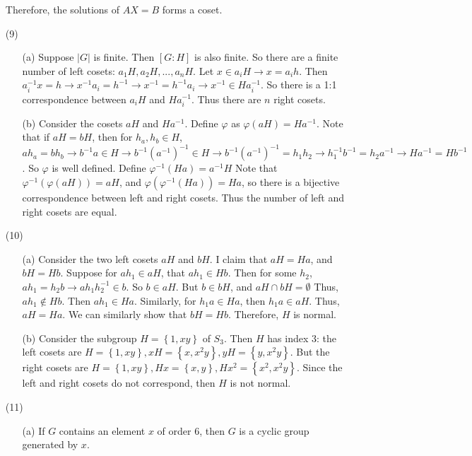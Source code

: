 \begin{itemize}
Therefore, the solutions of $AX = B$ forms a coset.

\item[(9)]
\begin{itemize}
\item[(a)]
Suppose $|G|$ is finite. Then $[G : H]$ is also finite. So there are a finite number of left cosets: $a_1H, a_2H, ..., a_nH$. Let $x \in a_iH \rightarrow x = a_ih$. Then $a_i^{-1}x = h \rightarrow x^{-1}a_i = h^{-1} \rightarrow x^{-1} = h^{-1}a_i \rightarrow x^{-1} \in Ha_i^{-1}$. So there is a 1:1 correspondence between $a_iH$ and $Ha_i^{-1}$. Thus there are $n$ right cosets.
\item[(b)]
Consider the cosets $aH$ and $Ha^{-1}$. Define $\varphi$ as $\varphi(aH) = Ha^{-1}$. Note that if $aH = bH$, then for $h_a, h_b \in H$, $ah_a = bh_b \rightarrow b^{-1}a \in H \rightarrow b^{-1}(a^{-1})^{-1} \in H \rightarrow b^{-1}(a^{-1})^{-1} = h_1h_2 \rightarrow h_1^{-1}b^{-1} = h_2a^{-1} \rightarrow Ha^{-1} = Hb^{-1}$. So $\varphi$ is well defined. Define $\varphi^{-1}(Ha) = a^{-1}H$ Note that $\varphi^{-1}(\varphi(aH)) = aH$, and $\varphi(\varphi^{-1}(Ha)) = Ha$, so there is a bijective correspondence between left and right cosets. Thus the number of left and right cosets are equal.
\end{itemize}
\item[(10)]
\begin{itemize}
\item[(a)]
Consider the two left cosets $aH$ and $bH$. I claim that $aH = Ha$, and $bH = Hb$. Suppose for $ah_1 \in aH$, that $ah_1 \in Hb$. Then for some $h_2$, $ah_1 = h_2b \rightarrow ah_1h_2^{-1} \in b$. So $b \in aH$. But $b \in bH$, and $aH \cap bH = \emptyset$ Thus, $ah_1 \not \in Hb$. Then $ah_1 \in Ha$. Similarly, for $h_1a \in Ha$, then $h_1a \in aH$. Thus, $aH = Ha$. We can similarly show that $bH = Hb$. Therefore, $H$ is normal.
\item[(b)]
Consider the subgroup $H = \left\lbrace 1, xy \right\rbrace$ of $S_3$. Then $H$ has index 3: the left cosets are $H = \left\lbrace 1, xy \right\rbrace, xH = \left\lbrace x, x^2y \right\rbrace, yH = \left\lbrace y, x^2y \right\rbrace$. But the right cosets are $H = \left\lbrace 1, xy \right\rbrace, Hx = \left\lbrace x, y \right\rbrace, Hx^2 = \left\lbrace x^2, x^2y \right\rbrace$. Since the left and right cosets do not correspond, then $H$ is not normal.
\end{itemize}
\item[(11)]
\begin{itemize}
\item[(a)]
If $G$ contains an element $x$ of order 6, then $G$ is	 a cyclic group generated by $x$.


\end{itemize}
\end{itemize}
